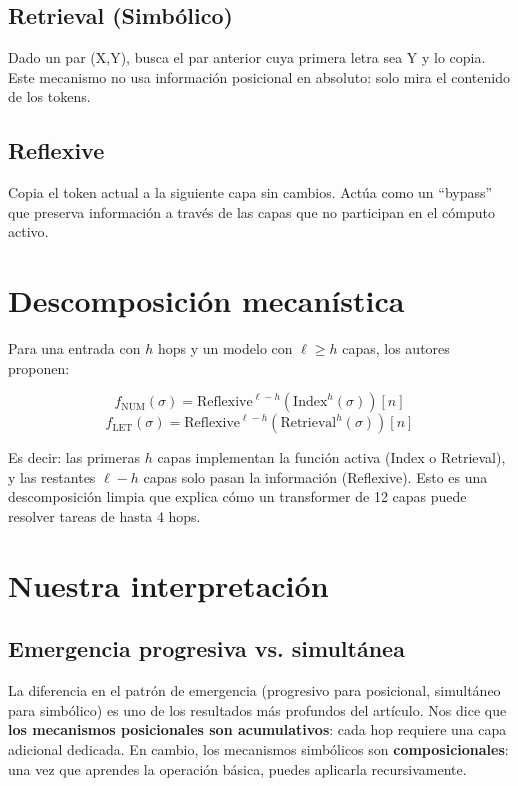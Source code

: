 \documentclass[12pt,a4paper,oneside]{report}
\begin{document}
\subsection{Retrieval (Simbólico)}
Dado un par (X,Y), busca el par anterior cuya primera letra sea Y y lo copia. Este mecanismo no usa información posicional en absoluto: solo mira el contenido de los tokens.

\subsection{Reflexive}
Copia el token actual a la siguiente capa sin cambios. Actúa como un ``bypass'' que preserva información a través de las capas que no participan en el cómputo activo.

\section{Descomposición mecanística}

Para una entrada con $h$ hops y un modelo con $\ell \geq h$ capas, los autores proponen:

\[
f_{\text{NUM}}(\sigma) = \text{Reflexive}^{\ell-h}(\text{Index}^h(\sigma))[n]
\]
\[
f_{\text{LET}}(\sigma) = \text{Reflexive}^{\ell-h}(\text{Retrieval}^h(\sigma))[n]
\]

Es decir: las primeras $h$ capas implementan la función activa (Index o Retrieval), y las restantes $\ell-h$ capas solo pasan la información (Reflexive). Esto es una descomposición limpia que explica cómo un transformer de 12 capas puede resolver tareas de hasta 4 hops.

\section{Nuestra interpretación}

\subsection{Emergencia progresiva vs. simultánea}

La diferencia en el patrón de emergencia (progresivo para posicional, simultáneo para simbólico) es uno de los resultados más profundos del artículo. Nos dice que \textbf{los mecanismos posicionales son acumulativos}: cada hop requiere una capa adicional dedicada. En cambio, los mecanismos simbólicos son \textbf{composicionales}: una vez que aprendes la operación básica, puedes aplicarla recursivamente.
\end{document}
